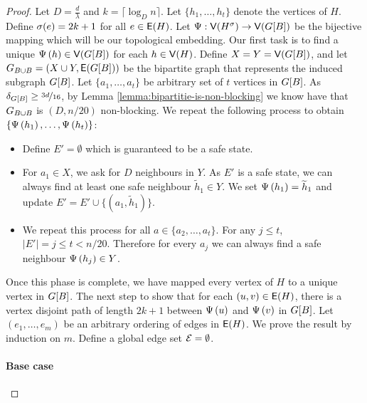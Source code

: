 \documentclass[11pt]{article}
\begin{document}
\begin{proof}
Let $D = \frac{d}{\lambda}$ and $k =  \lceil\log_D n\rceil$.
Let $\{ h_1, \dots, h_t\}$ denote the vertices of $H$.
Define $\sigma(e) = 2k+1$ for all $e \in \mathsf{E}(H)$.
Let $\Psi: \mathsf{V}({H}^{\sigma}) \rightarrow \mathsf{V}(G[{B}])$ be the bijective mapping which will be our topological embedding.
Our first task is to find a unique $\Psi\left(h\right) \in \mathsf{V}(G[B])$ for each $h \in \mathsf{V}(H)$.
Define $X = Y = \mathsf{V}(G[B])$, and let $G_{B \cup B} = (X \cup Y, \mathsf{E}(G[B]))$ be the bipartite graph that represents the induced subgraph $G[B]$.
Let $\{a_1, \dots, a_{t}\}$ be arbitrary set of $t$ vertices in $G[B]$.
As $\delta_{G[B]} \geq \nicefrac{3d}{16}$, by Lemma \ref{lemma:bipartitie-is-non-blocking} we know have that $G_{B \cup B}$ is $(D, n/20)$ non-blocking.
We repeat the following process to obtain $\{ \Psi\left(h_1\right), \dots, \Psi\left(h_t\right)\}$:

\begin{itemize}
\item Define $E' = \emptyset$ which is guaranteed to be a  safe state.

\item For $a_1 \in X$, we ask for $D$ neighbours in $Y$. As $E'$ is a safe state, we can always find at least one safe neighbour $\tilde{h}_1 \in Y$. We set $\Psi\left(h_1\right) = \widetilde{h}_1$ and update $E' = E'  \cup \{(a_1, \tilde{h}_1)\}$.

\item We repeat this process for all $a \in \{a_2, \dots, a_t\}$. For any $j \leq t$,  $|E'| = j \leq t < n/20$.
  Therefore for every $a_j$ we can always find a safe neighbour $\Psi\left(h_j\right) \in Y$.

\end{itemize}

Once this phase is complete, we have mapped every vertex of $H$ to a unique vertex in $G[B]$.
The next step to show that for each $(u,v) \in \mathsf{E}(H)$, there is a vertex disjoint path of length $2k+1$ between $\Psi\left(u\right)$ and $\Psi\left(v\right)$ in $G[B]$.
Let $(e_1, \dots, e_m)$ be an arbitrary ordering of edges in $\mathsf{E}(H)$.
We prove the result by induction on $m$. Define a global edge set  $\mathcal{E} = \emptyset$.

\paragraph{Base case}


\end{proof}
\end{document}
